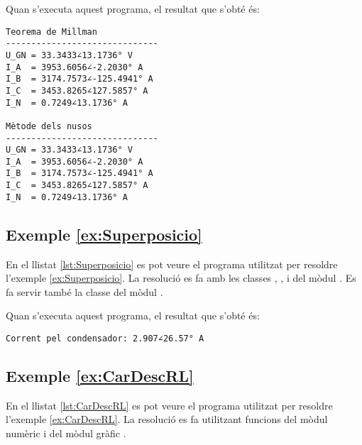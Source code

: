 Quan s'executa aquest programa, el resultat que s'obté és:
\lstset{
	language=,
	numbers=none,
	frame=none
}
\begin{lstlisting}
Teorema de Millman
------------------------------
U_GN = 33.3433∠13.1736° V
I_A  = 3953.6056∠-2.2030° A
I_B  = 3174.7573∠-125.4941° A
I_C  = 3453.8265∠127.5857° A
I_N  = 0.7249∠13.1736° A

Mètode dels nusos
------------------------------
U_GN = 33.3433∠13.1736° V
I_A  = 3953.6056∠-2.2030° A
I_B  = 3174.7573∠-125.4941° A
I_C  = 3453.8265∠127.5857° A
I_N  = 0.7249∠13.1736° A
\end{lstlisting} 


\hypertarget{exemple:Superposicio}{\subsection{Exemple \ref*{ex:Superposicio} \Superposicio}}

En el llistat \vref{lst:Superposicio} es pot veure el programa utilitzat per resoldre l'exemple \vref{ex:Superposicio}. La resolució es fa amb les classes , ,  i  del mòdul . Es fa servir també la classe  del mòdul .


Quan s'executa aquest programa, el resultat que s'obté és:
\lstset{
	language=,
	numbers=none,
	frame=none
}
\begin{lstlisting}
Corrent pel condensador: 2.907∠26.57° A
\end{lstlisting} 


\hypertarget{exemple:CarDescRL}{\subsection{Exemple \ref*{ex:CarDescRL} \CarDescRL}}

En el llistat \vref{lst:CarDescRL} es pot veure el programa utilitzat per resoldre l'exemple \vref{ex:CarDescRL}. La resolució es fa utilitzant funcions del mòdul numèric  i del mòdul gràfic  .


